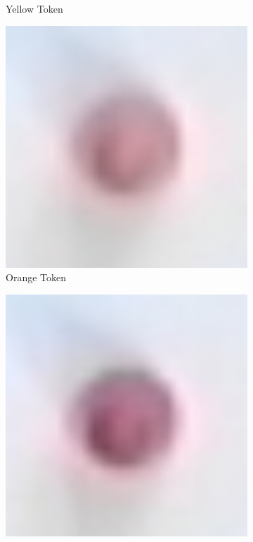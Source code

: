 \documentclass[12pt]{article}
\begin{document}
\begin{figure}[H]
\begin{subfigure}{0.2\textwidth}
        \caption{Yellow Token}
        \label{fig:tokencolorc}
    \end{subfigure}
    \begin{subfigure}{0.2\textwidth}
        \includegraphics[width=1\textwidth]{images/figures/fig10d}
        \caption{Orange Token}
        \label{fig:tokencolord}
    \end{subfigure}
    \begin{subfigure}{0.2\textwidth}
        \includegraphics[width=1\textwidth]{images/figures/fig10e}

\end{subfigure}
\end{figure}
\end{document}
